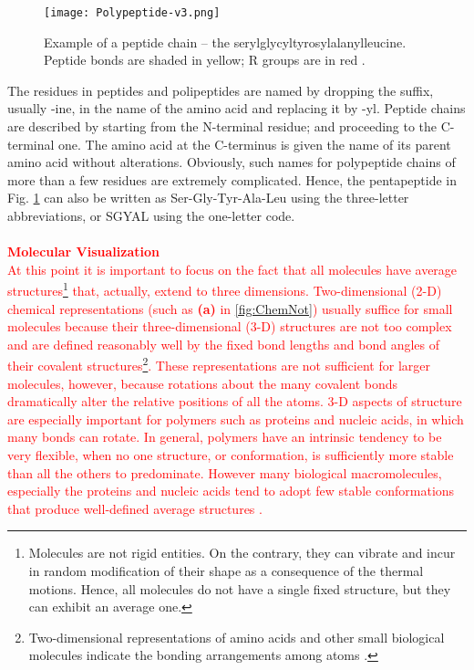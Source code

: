 \begin{figure}[h]
\centering
\begin{minipage}[t]{0.8\textwidth}
\centering
\texttt{[image: Polypeptide-v3.png]}

\caption{\small{Example of a peptide chain -- the serylglycyltyrosylalanylleucine. Peptide bonds are shaded in yellow; R groups are in red
\cite{nelson2008lehninger}.}}

\label{fig:PentaPeptide}
\end{minipage} 
\end{figure}

The residues in peptides and polipeptides are named by dropping the suffix, usually -ine, in the name of the amino acid and replacing it by -yl. Peptide chains are described by starting from the N-terminal residue;  and proceeding to the C-terminal one. The amino acid at the C-terminus is given the name of its parent amino acid without alterations. Obviously, such names for polypeptide chains of more than a few residues are extremely complicated. Hence, the pentapeptide in Fig. \ref{fig:PentaPeptide} can also be written as Ser-Gly-Tyr-Ala-Leu using the three-letter abbreviations, or SGYAL using the one-letter code.\\
 \\
\textcolor{red}{\textbf{Molecular Visualization}\\
At this point it is important to focus on the fact that all molecules have average structures\footnote{Molecules are not rigid entities. On the contrary, they can vibrate and incur in random modification of their shape as a consequence of the thermal motions. Hence, all molecules do not have a single fixed structure, but they can exhibit an average one.} that, actually, extend to three dimensions. Two-dimensional (2-D) chemical representations (such as \textbf{(a)} in \ref{fig:ChemNot}) usually suffice for small molecules because their three-dimensional (3-D) structures are not too complex and are defined reasonably well by the fixed bond lengths and bond angles of their covalent structures\footnote{Two-dimensional representations of amino acids and other small biological molecules indicate the bonding arrangements among atoms 
\cite{voet2016fundamentals}.}.
These representations are not sufficient for larger molecules, however, because rotations about the many covalent bonds dramatically alter the relative positions of all the atoms. 
3-D aspects of structure are especially important for polymers such as proteins and nucleic acids, in which many bonds can rotate. In general, polymers have an intrinsic tendency to be very flexible, when no one structure, or conformation, is sufficiently more stable than all the others to predominate. However many biological macromolecules, especially the proteins and nucleic acids tend to adopt few stable conformations that produce well-defined average structures
\cite{nelson2008lehninger}.}

